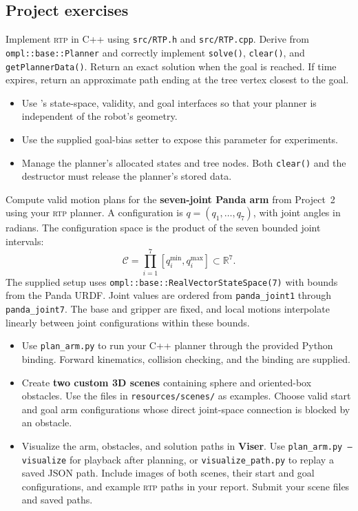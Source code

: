 \documentclass{comp450}
\begin{document}
\subsection*{Project exercises}
\begin{enumerate*}
    \item
    Implement \textsc{rtp} in C++ using \texttt{src/RTP.h} and \texttt{src/RTP.cpp}.
    Derive from \texttt{ompl::base::Planner} and correctly implement
    \texttt{solve()}, \texttt{clear()}, and \texttt{getPlannerData()}.
    Return an exact solution when the goal is reached.
    If time expires, return an approximate path ending at the tree vertex closest to the goal.
    \begin{itemize}
        \item Use \ompl's state-space, validity, and goal interfaces so that your planner is independent of the robot's geometry.
        \item Use the supplied goal-bias setter to expose this parameter for experiments.
        \item Manage the planner's allocated states and tree nodes.
        Both \texttt{clear()} and the destructor must release the planner's stored data.
    \end{itemize}

    \item
    Compute valid motion plans for the \textbf{seven-joint Panda arm} from Project~2 using your \textsc{rtp} planner.
    A configuration is $q=(q_1,\ldots,q_7)$, with joint angles in radians.
    The configuration space is the product of the seven bounded joint intervals:
    \[
        \mathcal{C}=\prod_{i=1}^{7}[q_i^{\min},q_i^{\max}]
        \subset\mathbb{R}^{7}.
    \]
    The supplied setup uses \texttt{ompl::base::RealVectorStateSpace(7)} with bounds from the Panda URDF.
    Joint values are ordered from \texttt{panda\_joint1} through \texttt{panda\_joint7}.
    The base and gripper are fixed, and local motions interpolate linearly between joint configurations within these bounds.
    \begin{itemize}
        \item Use \texttt{plan\_arm.py} to run your C++ planner through the provided Python binding.
        Forward kinematics, collision checking, and the binding are supplied.
        \item Create \textbf{two custom 3D scenes} containing sphere and oriented-box obstacles.
        Use the files in \texttt{resources/scenes/} as examples.
        Choose valid start and goal arm configurations whose direct joint-space connection is blocked by an obstacle.
        \item Visualize the arm, obstacles, and solution paths in \textbf{Viser}.
        Use \texttt{plan\_arm.py --visualize} for playback after planning, or
        \texttt{visualize\_path.py} to replay a saved JSON path.
        Include images of both scenes, their start and goal configurations, and example \textsc{rtp} paths in your report.
        Submit your scene files and saved paths.
    \end{itemize}


\end{enumerate*}
\end{document}
